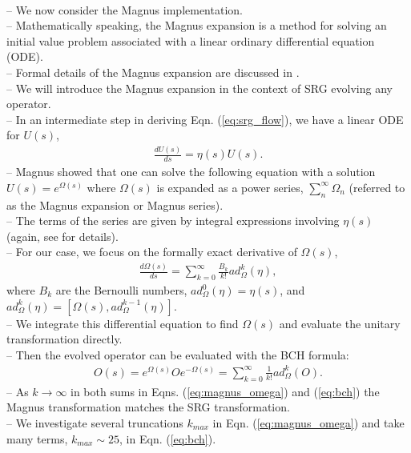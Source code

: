 \documentclass[preprintnumbers,floatfix,aps,prc,preprint,nofootinbib]{revtex4-1}
\begin{document}
\\
-- We now consider the Magnus implementation.
\\
-- Mathematically speaking, the Magnus expansion is a method for solving an initial value problem associated with a linear ordinary differential equation (ODE).
\\
-- Formal details of the Magnus expansion are discussed in \cite{Blanes:2009ab}.
\\
-- We will introduce the Magnus expansion in the context of SRG evolving any operator.
\\
-- In an intermediate step in deriving Eqn. (\ref{eq:srg_flow}), we have a linear ODE for $U(s)$,
%
\begin{eqnarray}
  \label{eq:unitary_trans}
  \frac{dU(s)}{ds} = \eta(s) U(s).
\end{eqnarray}
%
-- Magnus showed that one can solve the following equation with a solution $U(s)=e^{\Omega(s)}$ where $\Omega(s)$ is expanded as a power series, $\sum_{n}^{\infty} \Omega_n$ (referred to as the Magnus expansion or Magnus series).
\\
-- The terms of the series are given by integral expressions involving $\eta(s)$ (again, see \cite{Blanes:2009ab, Magnus:1954zz} for details).
\\
-- For our case, we focus on the formally exact derivative of $\Omega(s)$,
%
\begin{eqnarray}
  \label{eq:magnus_omega}
  \frac{d\Omega(s)}{ds} = \sum_{k=0}^{\infty} \frac{B_k}{k!} ad_{\Omega}^{k}(\eta),
\end{eqnarray}
%
where $B_k$ are the Bernoulli numbers, $ad_{\Omega}^{0}(\eta)=\eta(s)$, and $ad_{\Omega}^{k}(\eta)=[\Omega(s),ad_{\Omega}^{k-1}(\eta)]$.
\\
-- We integrate this differential equation to find $\Omega(s)$ and evaluate the unitary transformation directly.
\\
-- Then the evolved operator can be evaluated with the BCH formula:
%
\begin{eqnarray}
  \label{eq:bch}
  O(s) = e^{\Omega(s)} O e^{-\Omega(s)} = \sum_{k=0}^{\infty} \frac{1}{k!} ad_{\Omega}^{k}(O).
\end{eqnarray}
%
-- As $k \rightarrow \infty$ in both sums in Eqns. (\ref{eq:magnus_omega}) and (\ref{eq:bch}) the Magnus transformation matches the SRG transformation.
\\
-- We investigate several truncations $k_{max}$ in Eqn. (\ref{eq:magnus_omega}) and take many terms, $k_{max} \sim 25$, in Eqn. (\ref{eq:bch}).
\end{document}
